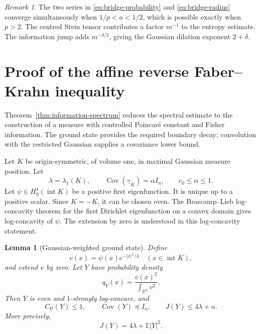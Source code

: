 \documentclass[11pt]{amsart}
\numberwithin{equation}{section}
\newtheorem{lemma}[theorem]{Lemma}
\theoremstyle{definition}
\theoremstyle{remark}
\newtheorem{remark}[theorem]{Remark}
\newcommand{\R}{\mathbb R}
\newcommand{\E}{\mathbb E}
\newcommand{\Id}{I_n}
\newcommand{\CP}{C_{\mathrm P}}
\DeclareMathOperator{\Cov}{Cov}
\DeclareMathOperator{\Int}{int}
\begin{document}
\begin{remark}\label{rem:critical-exponent}
The two series in \eqref{eq:bridge-probability} and
\eqref{eq:bridge-radius} converge simultaneously when
\(1/p<a<1/2\), which is possible exactly when \(p>2\).
The centred Stein tensor contributes a factor \(m^{-1}\) to the entropy
estimate. The information jump adds \(m^{-\delta/2}\), giving the
Gaussian dilation exponent \(2+\delta\).
\end{remark}

\section{Proof of the affine reverse Faber--Krahn inequality}
\label{sec:main-proof}

Theorem~\ref{thm:information-spectrum} reduces the spectral estimate to
the construction of a measure with controlled Poincar\'e constant and
Fisher information. The ground state provides the required boundary
decay; convolution with the restricted Gaussian supplies a covariance
lower bound.

Let \(K\) be origin-symmetric, of volume one, in maximal Gaussian
measure position. Let
\[
\lambda=\lambda_1(K),\qquad
\Cov(\gamma_K)=\alpha\Id,\qquad c_0\le\alpha\le1.
\]
Let \(\psi\in H_0^1(\Int K)\) be a positive first eigenfunction.
It is unique up to a positive scalar. Since \(K=-K\), it can be
chosen even. The Brascamp--Lieb log-concavity theorem for the first
Dirichlet eigenfunction on a convex domain \cite{BL76} gives
log-concavity of \(\psi\). The extension by zero is understood in this
log-concavity statement.

\begin{lemma}[Gaussian-weighted ground state]\label{lem:groundstate}
Define
\[
v(x)=\psi(x)e^{-|x|^2/4}\quad(x\in \Int K),
\]
and extend \(v\) by zero. Let \(Y\) have probability density
\[
q_Y(x)=\frac{v(x)^2}{\int_{\R^n}v^2}.
\]
Then \(Y\) is even and \(1\)-strongly log-concave, and
\[
\CP(Y)\le1,\qquad
\Cov(Y)\preceq\Id,\qquad
J(Y)\le4\lambda+n.
\]
More precisely,
\begin{equation}\label{eq:groundstate-exact}
J(Y)=4\lambda+\E|Y|^2.
\end{equation}
\end{lemma}
\end{document}
